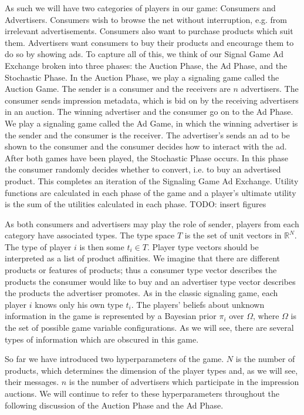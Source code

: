 \documentclass{article}
\begin{document}
As such we will have two categories of players in our game: Consumers and Advertisers. Consumers wish to browse the net without interruption, e.g. from irrelevant advertisements. Consumers also want to purchase products which suit them. Advertisers want consumers to buy their products and encourage them to do so by showing ads. To capture all of this, we think of our Signal Game Ad Exchange broken into three phases: the Auction Phase, the Ad Phase, and the Stochastic Phase. In the Auction Phase, we play a signaling game called the Auction Game. The sender is a consumer and the receivers are $n$ advertisers. The consumer sends impression metadata, which is bid on by the receiving advertisers in an auction. The winning advertiser and the consumer go on to the Ad Phase. We play a signaling game called the Ad Game, in which the winning advertiser is the sender and the consumer is the receiver. The advertiser's sends an ad to be shown to the consumer and the consumer decides how to interact with the ad. After both games have been played, the Stochastic Phase occurs. In this phase the consumer randomly decides whether to convert, i.e. to buy an advertised product. This completes an iteration of the Signaling Game Ad Exchange. Utility functions are calculated in each phase of the game and a player's ultimate utility is the sum of the utilities calculated in each phase. TODO: insert figures

As both consumers and advertisers may play the role of sender, players from each category have associated types. The type space $T$ is the set of unit vectors in $\mathbb{R}^N$. The type of player $i$ is then some $t_i \in T$. Player type vectors should be interpreted as a list of product affinities. We imagine that there are different products or features of products; thus a consumer type vector describes the products the consumer would like to buy and an advertiser type vector describes the products the advertiser promotes.  As in the classic signaling game, each player $i$ knows only his own type $t_i$. The players' beliefs about unknown information in the game is represented by a Bayesian prior $\pi_i$ over $\Omega$, where $\Omega$ is the set of possible game variable configurations. As we will see, there are several types of information which are obscured in this game.

So far we have introduced two hyperparameters of the game. $N$ is the number of products, which determines the dimension of the player types and, as we will see, their messages. $n$ is the number of advertisers which participate in the impression auctions. We will continue to refer to these hyperparameters throughout the following discussion of the Auction Phase and the Ad Phase. 
\end{document}
